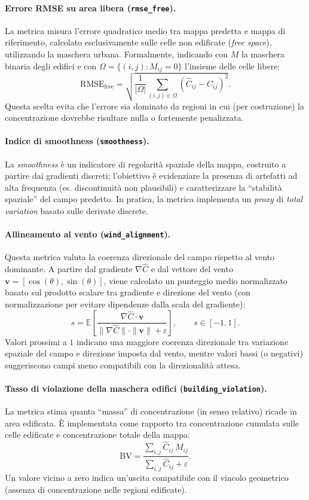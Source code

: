 \paragraph{Errore RMSE su area libera (\texttt{rmse\_free}).}
La metrica misura l’errore quadratico medio tra mappa predetta e mappa di riferimento, calcolato esclusivamente sulle celle non edificate (\emph{free space}), utilizzando la maschera urbana.
Formalmente, indicando con $M$ la maschera binaria degli edifici e con $\Omega=\{(i,j): M_{ij}=0\}$ l’insieme delle celle libere:
\[
    \mathrm{RMSE}_{\mathrm{free}} =
    \sqrt{\frac{1}{|\Omega|}\sum_{(i,j)\in\Omega}\left(\hat{C}_{ij}-C_{ij}\right)^2}.
\]
Questa scelta evita che l’errore sia dominato da regioni in cui (per costruzione) la concentrazione dovrebbe risultare nulla o fortemente penalizzata.

\paragraph{Indice di smoothness (\texttt{smoothness}).}
La \textit{smoothness} è un indicatore di regolarità spaziale della mappa, costruito a partire dai gradienti discreti; l’obiettivo è evidenziare la presenza di artefatti ad alta frequenza (es. discontinuità non plausibili) e caratterizzare la ``stabilità spaziale'' del campo predetto.
In pratica, la metrica implementa un \textit{proxy} di \emph{total variation} basato sulle derivate discrete.

\paragraph{Allineamento al vento (\texttt{wind\_alignment}).}
Questa metrica valuta la coerenza direzionale del campo rispetto al vento dominante.
A partire dal gradiente $\nabla \hat{C}$ e dal vettore del vento $\mathbf{v}=[\cos(\theta),\sin(\theta)]$, viene calcolato un punteggio medio normalizzato basato sul prodotto scalare tra gradiente e direzione del vento (con normalizzazione per evitare dipendenze dalla scala del gradiente):
\[
    s = \mathbb{E}\left[\frac{\nabla \hat{C}\cdot \mathbf{v}}{\|\nabla \hat{C}\|\cdot\|\mathbf{v}\|+\varepsilon}\right],
    \qquad s\in[-1,1].
\]
Valori prossimi a $1$ indicano una maggiore coerenza direzionale tra variazione spaziale del campo e direzione imposta dal vento, mentre valori bassi (o negativi) suggeriscono campi meno compatibili con la direzionalità attesa.

\paragraph{Tasso di violazione della maschera edifici (\texttt{building\_violation}).}
La metrica stima quanta ``massa'' di concentrazione (in senso relativo) ricade in area edificata.
È implementata come rapporto tra concentrazione cumulata sulle celle edificate e concentrazione totale della mappa:
\[
    \mathrm{BV}=\frac{\sum_{i,j}\hat{C}_{ij}\,M_{ij}}{\sum_{i,j}\hat{C}_{ij}+\varepsilon}.
\]
Un valore vicino a zero indica un’uscita compatibile con il vincolo geometrico (assenza di concentrazione nelle regioni edificate).

